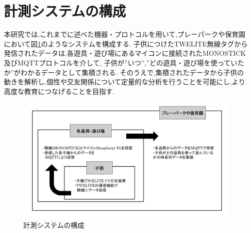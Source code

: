 \clearpage


\section{計測システムの構成}
本研究では,これまでに述べた機器・プロトコルを用いて,プレーパークや保育園において図\ref{system}のようなシステムを構成する.
子供につけたTWELITE無線タグから発信されたデータは,各遊具・遊び場にあるマイコンに接続されたMONOSTICK及びMQTTプロトコルを介して,
子供が”いつ”,”どの遊具・遊び場を使っていたか”がわかるデータとして集積される.
そのうえで,集積されたデータから子供の動きを解析し,個性や交友関係について定量的な分析を行うことを可能にし,より高度な教育につなげることを目指す.



\begin{figure}[!htb]
  \centering
  \includegraphics[width = 15.8cm, bb= 0 0 1000 600]{chapter2/kouseigaiyou.png}
  \caption{計測システムの構成}
  \label{system}
\end{figure}







